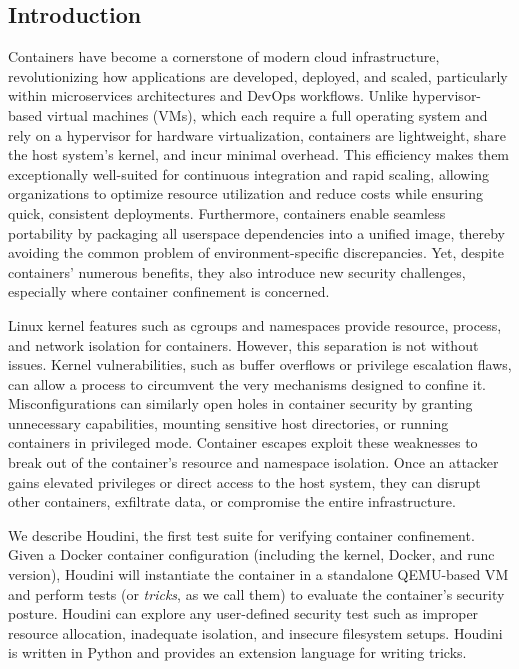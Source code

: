 \documentclass[12pt]{report}
\begin{document}
\begin{doublespace}
\chapter{Introduction}

Containers have become a cornerstone of modern cloud infrastructure, revolutionizing how applications are developed, deployed, and scaled, particularly within microservices architectures and DevOps workflows. Unlike hypervisor-based virtual machines (VMs), which each require a full operating system and rely on a hypervisor for hardware virtualization, containers are lightweight, share the host system’s kernel, and incur minimal overhead. This efficiency makes them exceptionally well-suited for continuous integration and rapid scaling, allowing organizations to optimize resource utilization and reduce costs while ensuring quick, consistent deployments. Furthermore, containers enable seamless portability by packaging all userspace dependencies into a unified image, thereby avoiding the common problem of environment-specific discrepancies. Yet, despite containers’ numerous benefits, they also introduce new security challenges, especially where container confinement is concerned.

Linux kernel features such as cgroups and namespaces provide resource, process, and network isolation for containers. However, this separation is not without issues. Kernel vulnerabilities, such as buffer overflows or privilege escalation flaws, can allow a process to circumvent the very mechanisms designed to confine it. Misconfigurations can similarly open holes in container security by granting unnecessary capabilities, mounting sensitive host directories, or running containers in privileged mode. Container escapes exploit these weaknesses to break out of the container’s resource and namespace isolation. Once an attacker gains elevated privileges or direct access to the host system, they can disrupt other containers, exfiltrate data, or compromise the entire infrastructure.

We describe Houdini, the first test suite for verifying container confinement. Given a Docker container configuration (including the kernel, Docker, and runc version), Houdini will instantiate the container in a standalone QEMU-based VM and perform tests (or \textit{tricks}, as we call them) to evaluate the container's security posture. Houdini can explore any user-defined security test such as improper resource allocation, inadequate isolation, and insecure filesystem setups. Houdini is written in Python and provides an extension language for writing tricks.


\end{doublespace}
\end{document}
